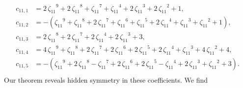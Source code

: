 \documentclass[12pt]{amsart}
\theoremstyle{definition}
\theoremstyle{remark}
\numberwithin{equation}{section}
\begin{document}
\begin{align*}
c_{11,1} &= 2\,{\zeta_{11}}^{9}+2\,{\zeta_{11}}^{8}+{\zeta_{11}}^{7}+{\zeta_{11}}^{4}+2\,{\zeta_{11}}^{3}+2
\,{\zeta_{11}}^{2}+1,\\
c_{11,2} & =-({\zeta_{11}}^{9}+{\zeta_{11}}^{8}+2\,{\zeta_{11}}^{7}+{\zeta_{11}}^{6}+{\zeta_{11}}^{5}+2\,{
\zeta_{11}}^{4}+{\zeta_{11}}^{3}+{\zeta_{11}}^{2}+1),\\
c_{11,3} &= 2\,{\zeta_{11}}^{8}+2\,{\zeta_{11}}^{7}+2\,{\zeta_{11}}^{4}+2\,{\zeta_{11}}^{3}+3,\\
c_{11,4} &= 4\,{\zeta_{11}}^{9}+{\zeta_{11}}^{8}+2\,{\zeta_{11}}^{7}+2\,{\zeta_{11}}^{6}
+2\,{\zeta_{11}}^{5}+2\,{\zeta_{11}}^{4}+{\zeta_{11}}^{3}+4\,{\zeta_{11}}^{2}+4,\\
c_{11,5} &=-({\zeta_{11}}^{9}+2\,{\zeta_{11}}^{8}-{\zeta_{11}}^{7}+2\,{\zeta_{11}}^{6}+2\,{\zeta_{11}}^{5}-
{\zeta_{11}}^{4}+2\,{\zeta_{11}}^{3}+{\zeta_{11}}^{2}+3).\\
\end{align*}
Our theorem reveals hidden symmetry in these coefficients. We find \\
\end{document}
